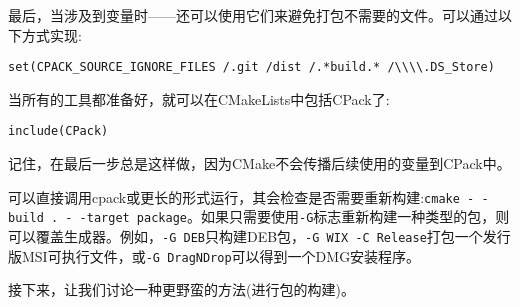 最后，当涉及到变量时——还可以使用它们来避免打包不需要的文件。可以通过以下方式实现:

\begin{lstlisting}[style=styleCMake]
set(CPACK_SOURCE_IGNORE_FILES /.git /dist /.*build.* /\\\\.DS_Store)
\end{lstlisting}

当所有的工具都准备好，就可以在CMakeLists中包括CPack了:

\begin{lstlisting}[style=styleCMake]
include(CPack)
\end{lstlisting}

记住，在最后一步总是这样做，因为CMake不会传播后续使用的变量到CPack中。

可以直接调用cpack或更长的形式运行，其会检查是否需要重新构建:\texttt{cmake -\,-build . -\,-target package}。如果只需要使用\texttt{-G}标志重新构建一种类型的包，则可以覆盖生成器。例如，\texttt{-G DEB}只构建DEB包，\texttt{-G WIX -C Release}打包一个发行版MSI可执行文件，或\texttt{-G DragNDrop}可以得到一个DMG安装程序。

接下来，让我们讨论一种更野蛮的方法(进行包的构建)。
